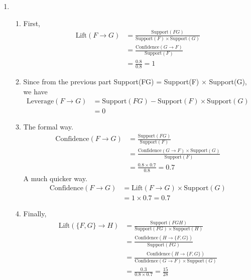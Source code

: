 \documentclass{article}
\begin{document}
\begin{enumerate}
\begin{enumerate}
        \item
        \begin{enumerate}
            \item First,
            \begin{align*}
                \text{Lift}(F \rightarrow G) &= \frac{\text{Support}(FG)}{\text{Support}(F)\times\text{Support}(G)}\\
                &= \frac{\text{Confidence}(G \rightarrow F)}{\text{Support}(F)}\\
                &= \frac{0.8}{0.8} = 1
            \end{align*}
            
            \item Since from the previous part Support(FG) = Support(F) $\times$ Support(G), we have
            \begin{align*}
                \text{Leverage}(F \rightarrow G) &= \text{Support}(FG)-\text{Support}(F)\times\text{Support}(G)\\
                &= 0
            \end{align*}
            
            \item The formal way.
            \begin{align*}
                \text{Confidence}(F \rightarrow G) &= \frac{\text{Support}(FG)}{\text{Support}(F)}\\
                &= \frac{\text{Confidence}(G \rightarrow F)\times\text{Support}(G)}{\text{Support}(F)}\\
                &= \frac{0.8\times0.7}{0.8} = 0.7
            \end{align*}
            A much quicker way.
            \begin{align*}
                \text{Confidence}(F \rightarrow G) &= \text{Lift}(F \rightarrow G) \times \text{Support}(G)\\
                &= 1 \times 0.7 = 0.7
            \end{align*}
            
            \item Finally,
            \begin{align*}
                \text{Lift}(\{F,G\} \rightarrow H) &= \frac{\text{Support}(FGH)}{\text{Support}(FG)\times\text{Support}(H)}\\
                &= \frac{\text{Confidence}(H \rightarrow \{F,G\})}{\text{Support}(FG)}\\
                &= \frac{\text{Confidence}(H \rightarrow \{F,G\})}{\text{Confidence}(G \rightarrow F)\times\text{Support}(G)}\\
                &= \frac{0.3}{0.8\times0.7} = \frac{15}{28}
            \end{align*}
        \end{enumerate}
    \end{enumerate}
    

\end{enumerate}
\end{document}
